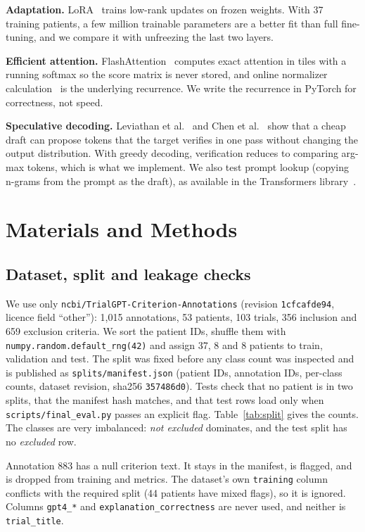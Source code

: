 \documentclass[conference]{IEEEtran}
\begin{document}
\textbf{Adaptation.} LoRA~\cite{lora} trains low-rank updates on frozen weights. With 37 training patients, a few million trainable parameters are a better fit than full fine-tuning, and we compare it with unfreezing the last two layers.

\textbf{Efficient attention.} FlashAttention~\cite{flash} computes exact attention in tiles with a running softmax so the score matrix is never stored, and online normalizer calculation~\cite{online} is the underlying recurrence. We write the recurrence in PyTorch for correctness, not speed.

\textbf{Speculative decoding.} Leviathan et al.~\cite{leviathan} and Chen et al.~\cite{chen} show that a cheap draft can propose tokens that the target verifies in one pass without changing the output distribution. With greedy decoding, verification reduces to comparing arg-max tokens, which is what we implement. We also test prompt lookup (copying n-grams from the prompt as the draft), as available in the Transformers library~\cite{hf}.

\section{Materials and Methods}

\subsection{Dataset, split and leakage checks}
We use only \texttt{ncbi/TrialGPT-Criterion-Annotations} (revision \texttt{1cfcafde94}, licence field ``other''): 1,015 annotations, 53 patients, 103 trials, 356 inclusion and 659 exclusion criteria. We sort the patient IDs, shuffle them with \texttt{numpy.random.default\_rng(42)} and assign 37, 8 and 8 patients to train, validation and test. The split was fixed before any class count was inspected and is published as \texttt{splits/manifest.json} (patient IDs, annotation IDs, per-class counts, dataset revision, sha256 \texttt{357486d0}). Tests check that no patient is in two splits, that the manifest hash matches, and that test rows load only when \texttt{scripts/final\_eval.py} passes an explicit flag. Table~\ref{tab:split} gives the counts. The classes are very imbalanced: \emph{not excluded} dominates, and the test split has no \emph{excluded} row.

Annotation 883 has a null criterion text. It stays in the manifest, is flagged, and is dropped from training and metrics. The dataset's own \texttt{training} column conflicts with the required split (44 patients have mixed flags), so it is ignored. Columns \texttt{gpt4\_*} and \texttt{explanation\_correctness} are never used, and neither is \texttt{trial\_title}.
\end{document}
